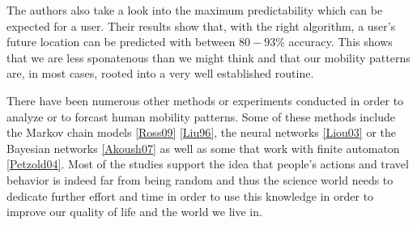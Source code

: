 The authors also take a look into the maximum predictability which can be
expected for a user. Their results show that, with the right algorithm, a user's
future location can be predicted with between $80-93\%$ accuracy. This shows
that we are less sponatenous than we might think and that our mobility patterns
are, in most cases, rooted into a very well established routine.

There have been numerous other methods or experiments conducted in order to
analyze or to forcast human mobility patterns. Some of these methods include the
Markov chain models \ref{Ross09} \ref{Liu96}, the neural networks \ref{Liou03}
or the Bayesian networks \ref{Akoush07} as well as some that work with finite
automaton \ref{Petzold04}. Most of the studies support the idea that people's
actions and travel behavior is indeed far from being random and thus the science
world needs to dedicate further effort and time in order to use this knowledge
in order to improve our quality of life and the world we live in.
